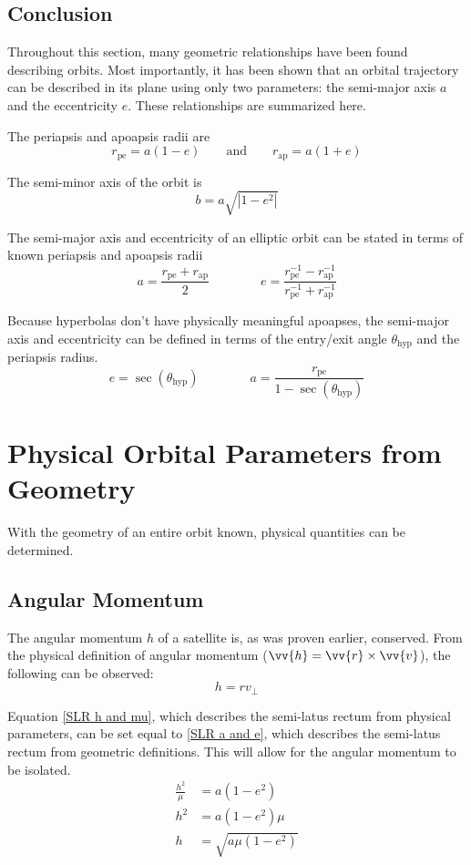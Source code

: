 \documentclass{article}
\begin{document}
\bigskip\bigskip
\subsection{Conclusion}

Throughout this section, many geometric relationships have been found describing orbits. Most importantly, it has been shown that an orbital trajectory can be described in its plane using only two parameters: the semi-major axis $a$ and the eccentricity $e$. These relationships are summarized here.

\bigskip
The periapsis and apoapsis radii are
$$r_\text{pe}=a(1-e)\qquad\text{and}\qquad r_\text{ap}=a(1+e)$$

\bigskip
The semi-minor axis of the orbit is
$$b=a\sqrt{|1-e^2|}$$

\bigskip
The semi-major axis and eccentricity of an elliptic orbit can be stated in terms of known periapsis and apoapsis radii
$$a=\frac{r_\text{pe}+r_\text{ap}}{2}\qquad\qquad e=\frac{r_\text{pe}^{-1}-r_\text{ap}^{-1}}{r_\text{pe}^{-1}+r_\text{ap}^{-1}}$$

Because hyperbolas don't have physically meaningful apoapses, the semi-major axis and eccentricity can be defined in terms of the entry/exit angle $\theta_\text{hyp}$ and the periapsis radius.
$$e=\sec(\theta_\text{hyp})\qquad\qquad a=\frac{{r_\text{pe}}}{1-\sec(\theta_\text{hyp})}$$

\pagebreak
\section{Physical Orbital Parameters from Geometry}\label{Orbital Parameters from Geometry}
With the geometry of an entire orbit known, physical quantities can be determined.

\bigskip\bigskip
\subsection{Angular Momentum}\label{sec:Angular Momentum Geometric}

The angular momentum $h$ of a satellite is, as was proven earlier, conserved. From the physical definition of angular momentum ($\vv{h}=\vv{r}\times\vv{v}$), the following can be observed:
\begin{equation}\label{Angular Momentum Physical Definition}
    h=rv_\perp
\end{equation}

Equation \eqref{SLR h and mu}, which describes the semi-latus rectum from physical parameters, can be set equal to \eqref{SLR a and e}, which describes the semi-latus rectum from geometric definitions. This will allow for the angular momentum to be isolated.
\begin{align*}
    \frac{h^2}{\mu} & = a(1-e^2)           \\
    h^2             & = a(1-e^2)\mu        \\
    h               & = \sqrt{a\mu(1-e^2)} \\
\end{align*}
\end{document}

